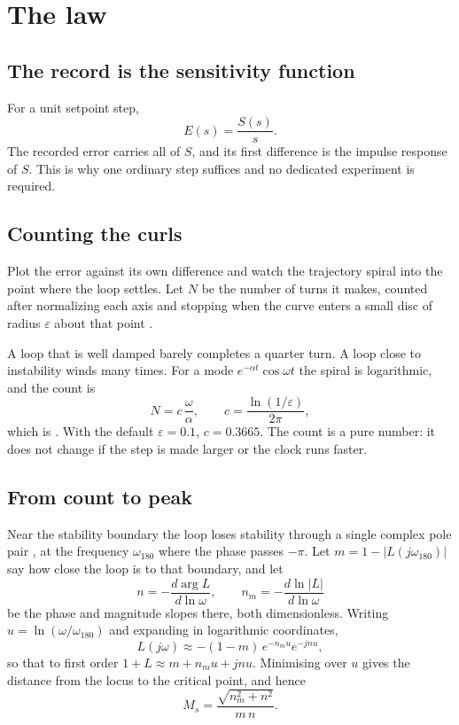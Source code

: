 \documentclass[final,3p,times,twocolumn]{elsarticle}
\begin{document}
\section{The law}
\label{sec:law}

\subsection{The record is the sensitivity function}

For a unit setpoint step,
\begin{equation}
E(s)=\frac{S(s)}{s}.
\label{eq:ES}
\end{equation}
The recorded error carries all of $S$, and its first difference is the
impulse response of $S$. This is why one ordinary step suffices and no
dedicated experiment is required.

\subsection{Counting the curls}

Plot the error against its own difference and watch the trajectory spiral
into the point where the loop settles. Let $N$ be the number of turns it
makes, counted after normalizing each axis and stopping when the curve
enters a small disc of radius $\varepsilon$ about that point
\cite[Def.~1]{SPIN}.

A loop that is well damped barely completes a quarter turn. A loop close
to instability winds many times. For a mode $e^{-\alpha t}\cos\omega t$
the spiral is logarithmic, and the count is
\begin{equation}
N=c\,\frac{\omega}{\alpha},\qquad c=\frac{\ln(1/\varepsilon)}{2\pi},
\label{eq:count}
\end{equation}
which is \cite[Prop.~3]{SPIN}. With the default $\varepsilon=0.1$,
$c=0.3665$. The count is a pure number: it does not change if the step
is made larger or the clock runs faster.

\subsection{From count to peak}

Near the stability boundary the loop loses stability through a single
complex pole pair \cite[Prop.~2]{SPIN}, at the frequency
$\omega_{180}$ where the phase passes $-\pi$. Let
$m=1-|L(j\omega_{180})|$ say how close the loop is to that boundary,
and let
\begin{equation}
n=-\frac{d\arg L}{d\ln\omega},\qquad
n_m=-\frac{d\ln|L|}{d\ln\omega}
\label{eq:slopes}
\end{equation}
be the phase and magnitude slopes there, both dimensionless. Writing
$u=\ln(\omega/\omega_{180})$ and expanding in logarithmic coordinates,
\begin{equation}
L(j\omega)\approx-(1-m)\,e^{-n_mu}e^{-jnu},
\label{eq:expand}
\end{equation}
so that to first order $1+L\approx m+n_mu+jnu$. Minimising over $u$
gives the distance from the locus to the critical point, and hence
\begin{equation}
M_s=\frac{\sqrt{n_m^2+n^2}}{m\,n}.
\label{eq:Ms}
\end{equation}
\end{document}
